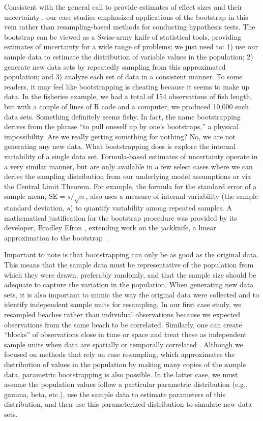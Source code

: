 \documentclass[fleqn,10pt]{wlpeerj} %
\begin{document}
Consistent with the general call to provide estimates of effect sizes and their uncertainty \citep[e.g.,][]{johnson1999}, our case studies emphasized applications of the bootstrap in this vein rather than resampling-based methods for conducting hypothesis tests. The bootstrap can be viewed as a Swiss-army knife of statistical tools, providing estimates of uncertainty for a wide range of problems; we just need to: 1) use our sample data to estimate the distribution of variable values in the population; 2) generate new data sets by repeatedly sampling from this approximated population; and 3) analyze each set of data in a consistent manner. To some readers, it may feel like bootstrapping is cheating because it seems to make up data. In the fisheries example, we had a total of 154 observations of fish length, but with a couple of lines of R code and a computer, we produced 10,000 such data sets. Something definitely seems fishy. In fact, the name bootstrapping derives from the phrase ``to pull oneself up by one's bootstraps,'' a physical impossibility. Are we really getting something for nothing? No, we are not generating any new data. What bootstrapping does is explore the internal variability of a single data set. Formula-based estimates of uncertainty operate in a very similar manner, but are only available in a few select cases where we can derive the sampling distribution from our underlying model assumptions or via the Central Limit Theorem. For example, the formula for the standard error of a sample mean, SE\(=s/\sqrt{n}\), also uses a measure of internal variability (the sample standard deviation, \(s\)) to quantify variability among repeated samples. A mathematical justification for the bootstrap procedure was provided by its developer, Bradley Efron \citep{efron1979}, extending work on the jackknife, a linear approximation to the bootstrap \citep{quenouille1949problems}.

Important to note is that bootstrapping can only be as good as the original data. This means that the sample data must be representative of the population from which they were drawn, preferably randomly, and that the sample size should be adequate to capture the variation in the population. When generating new data sets, it is also important to mimic the way the original data were collected and to identify independent sample units for resampling. In our first case study, we resampled beaches rather than individual observations because we expected observations from the same beach to be correlated. Similarly, one can create ``blocks'' of observations close in time or space and treat these as independent sample units when data are spatially or temporally correlated \citep{chernick_labudde_2011}. Although we focused on methods that rely on case resampling, which approximates the distribution of values in the population by making many copies of the sample data, parametric bootstrapping is also possible. In the latter case, we must assume the population values follow a particular parametric distribution (e.g., gamma, beta, etc.), use the sample data to estimate parameters of this distribution, and then use this parameterized distribution to simulate new data sets.
\end{document}
